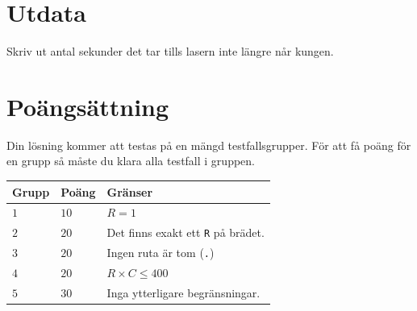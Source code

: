 \section*{Utdata}
Skriv ut antal sekunder det tar tills lasern inte längre når kungen.

\section*{Poängsättning}
Din lösning kommer att testas på en mängd testfallsgrupper.
För att få poäng för en grupp så måste du klara alla testfall i gruppen.

\noindent
\begin{tabular}{| l | l | l |}
\hline
  \textbf{Grupp} & \textbf{Poäng} & \textbf{Gränser} \\ \hline
  $1$    & $10$       &  $R=1$ \\ \hline
  $2$    & $20$       &  Det finns exakt ett \texttt{R} på brädet. \\ \hline
  $3$    & $20$       &  Ingen ruta är tom (\texttt{.}) \\ \hline
  $4$    & $20$       &  $R\times C \leq 400$ \\ \hline
  $5$    & $30$       &  Inga ytterligare begränsningar. \\ \hline
\end{tabular}

